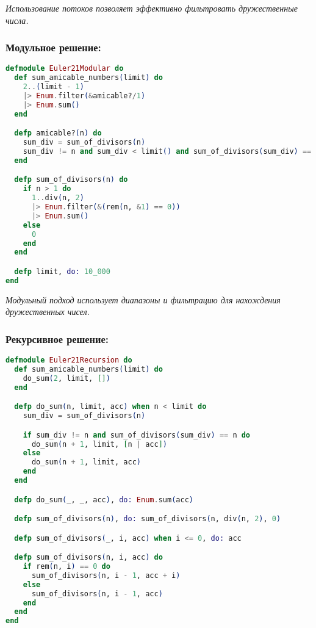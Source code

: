 \documentclass[a4paper]{article}
\begin{document}
\textit{Использование потоков позволяет эффективно фильтровать дружественные числа.}

\subsubsection*{Модульное решение:}

\begin{lstlisting}[language=elixir, caption={Модульный подход к поиску дружественных чисел},captionpos=b]
defmodule Euler21Modular do
  def sum_amicable_numbers(limit) do
    2..(limit - 1)
    |> Enum.filter(&amicable?/1)
    |> Enum.sum()
  end

  defp amicable?(n) do
    sum_div = sum_of_divisors(n)
    sum_div != n and sum_div < limit() and sum_of_divisors(sum_div) == n
  end

  defp sum_of_divisors(n) do
    if n > 1 do
      1..div(n, 2)
      |> Enum.filter(&(rem(n, &1) == 0))
      |> Enum.sum()
    else
      0
    end
  end

  defp limit, do: 10_000
end
\end{lstlisting}

\textit{Модульный подход использует диапазоны и фильтрацию для нахождения дружественных чисел.}

\subsubsection*{Рекурсивное решение:}

\begin{lstlisting}[language=elixir, caption={Рекурсивный подход к поиску дружественных чисел},captionpos=b]
defmodule Euler21Recursion do
  def sum_amicable_numbers(limit) do
    do_sum(2, limit, [])
  end

  defp do_sum(n, limit, acc) when n < limit do
    sum_div = sum_of_divisors(n)

    if sum_div != n and sum_of_divisors(sum_div) == n do
      do_sum(n + 1, limit, [n | acc])
    else
      do_sum(n + 1, limit, acc)
    end
  end

  defp do_sum(_, _, acc), do: Enum.sum(acc)

  defp sum_of_divisors(n), do: sum_of_divisors(n, div(n, 2), 0)

  defp sum_of_divisors(_, i, acc) when i <= 0, do: acc

  defp sum_of_divisors(n, i, acc) do
    if rem(n, i) == 0 do
      sum_of_divisors(n, i - 1, acc + i)
    else
      sum_of_divisors(n, i - 1, acc)
    end
  end
end
\end{lstlisting}
\end{document}
